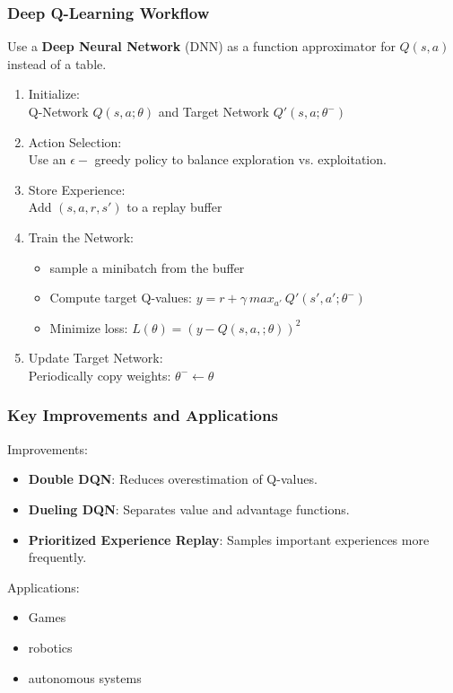 \begin{frame}
	\frametitle{Deep Q-Learning Workflow }
	\vspace{0.2cm}
	Use a \textbf{Deep Neural Network} (DNN) as a function approximator for $Q(s,a)$ instead of a table.
		\begin{enumerate}		
			\pause
			\item Initialize: \\ Q-Network $Q(s,a;\theta)$ and Target Network $Q'(s,a;\theta^{-})$
			\pause
			\item Action Selection: \\ Use an $\epsilon-$ greedy policy to balance exploration vs. exploitation.
			\pause
			\item Store Experience: \\ Add $(s,a,r,s')$ to a replay buffer
			\pause
			\item Train the Network: \\ 
				\begin{itemize} 
					 \item sample a minibatch from the buffer
					 \item Compute target Q-values: $y = r + \gamma \ max_{a'} \ Q'(s',a';\theta^{-})$
					\item Minimize loss: $L(\theta)=(y-Q(s,a,;\theta))^2$
				\end{itemize}
			\pause
			\item Update Target Network: \\ Periodically copy weights: $\theta^{-} \leftarrow \theta$

		\end{enumerate}
\end{frame}

\begin{frame}
	\frametitle{Key Improvements and Applications}
	\vspace{0.5cm}
	Improvements:
		\begin{itemize}		
			\item \textbf{Double DQN}: Reduces overestimation of Q-values.
			\item\textbf{Dueling DQN}: Separates value and advantage functions.
			\item \textbf{Prioritized Experience Replay}: Samples important experiences more frequently.
		\end{itemize}
	\pause
	Applications:
		\begin{itemize}
			\item Games
			\item robotics
			\item autonomous systems
		\end{itemize}
\end{frame}



